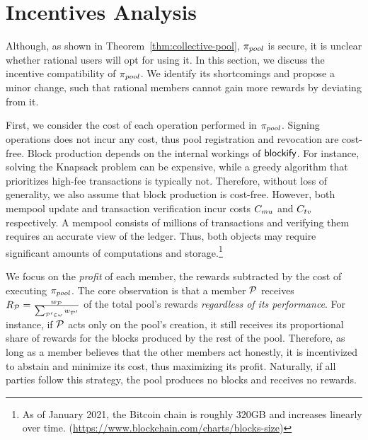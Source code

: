 \section{Incentives Analysis}\label{sec:incentives}

Although, as shown in Theorem~\ref{thm:collective-pool}, $\pi_{pool}$ is secure, it
is unclear whether rational users will opt for using it. In this section, we
discuss the incentive compatibility of $\pi_{pool}$. We identify its shortcomings
and propose a minor change, such that rational members cannot gain more rewards
by deviating from it.

First, we consider the cost of each operation performed in $\pi_{pool}$. Signing
operations does not incur any cost, thus pool registration and revocation are
cost-free. Block production depends on the internal workings of $\mathsf{blockify}$.
For instance, solving the Knapsack problem can be expensive, while a greedy
algorithm that prioritizes high-fee transactions is typically not. Therefore,
without loss of generality, we also assume that block production is cost-free.
However, both mempool update and transaction verification incur costs
$C_{mu}$ and $C_{tv}$ respectively. A mempool consists of millions of
transactions and verifying them requires an accurate view of the
ledger. Thus, both objects may require significant amounts of computations
and storage.\footnote{As of January 2021, the Bitcoin chain is
roughly $320$GB and increases linearly over time.
(\url{https://www.blockchain.com/charts/blocks-size})}

We focus on the \emph{profit} of each member, \ie the rewards subtracted by
the cost of executing $\pi_{pool}$. The core observation is that a member $\mathcal{P}$
receives $R_{\mathcal{P}} = \frac{w_{\mathcal{P}}}{\sum_{\mathcal{P}' \in \omega}
w_{\mathcal{P}'}}$ of the total pool's rewards \emph{regardless of its
performance}. For instance, if $\mathcal{P}$ acts only on the pool's
creation, it still receives its proportional share of rewards for the blocks
produced by the rest of the pool. Therefore, as long as a member believes that
the other members act honestly, it is incentivized to abstain and minimize its
cost, thus maximizing its profit. Naturally, if all parties follow this
strategy, the pool produces no blocks and receives no rewards.

